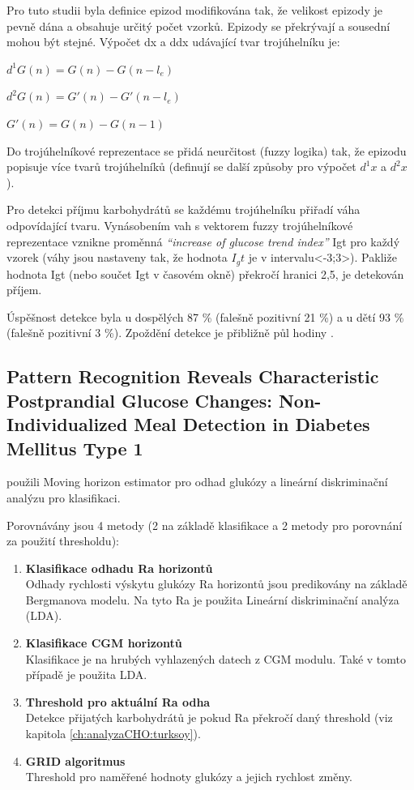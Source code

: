 Pro tuto studii byla definice epizod modifikována tak, že velikost epizody je pevně dána a obsahuje určitý počet vzorků. Epizody se překrývají a sousední mohou být stejné. Výpočet dx a ddx udávající tvar trojúhelníku je:

$d^{1}G(n)=G(n)-G(n-l_{e})$

$d^{2}G(n)=G'(n)-G'(n-l_{e})$

$G'(n)=G(n)-G(n-1)$

Do trojúhelníkové reprezentace se přidá neurčitost (fuzzy logika) tak, že epizodu popisuje více tvarů trojúhelníků (definují se další způsoby pro výpočet $d^1x$ a $d^2x$).

Pro detekci příjmu karbohydrátů se každému trojúhelníku přiřadí váha odpovídající tvaru. Vynásobením vah s vektorem fuzzy trojúhelníkové reprezentace vznikne proměnná \textit{“increase of glucose trend index”} Igt pro každý vzorek (váhy jsou nastaveny tak, že hodnota $I_gt$ je v intervalu<-3;3>). Pakliže hodnota Igt (nebo součet Igt v časovém okně) překročí hranici 2,5, je detekován příjem.

Úspěšnost detekce byla u dospělých 87 \% (falešně pozitivní 21 \%) a u dětí 93 \% (falešně pozitivní 3 \%). Zpoždění detekce je přibližně půl hodiny \citep{analyzaCHO.WaveletEst}.


\subsection{Pattern Recognition Reveals Characteristic Postprandial Glucose Changes: Non-Individualized Meal Detection in Diabetes Mellitus Type 1}
\label{ch:analyzaCHO:lda}

\citet{analyzaCHO.LDA} použili Moving horizon estimator pro odhad glukózy a lineární diskriminační analýzu pro klasifikaci.

Porovnávány jsou 4 metody (2 na základě klasifikace a 2 metody pro porovnání za použití thresholdu):

\begin{enumerate}
\item \textbf{Klasifikace odhadu Ra horizontů} \\
Odhady rychlosti výskytu glukózy Ra horizontů jsou predikovány na základě Bergmanova modelu. Na tyto Ra je použita Lineární diskriminační analýza (LDA).
\item \textbf{Klasifikace CGM horizontů} \\
Klasifikace je na hrubých vyhlazených datech z CGM modulu. Také v tomto případě je použita LDA.
\item \textbf{Threshold pro aktuální Ra odha} \\
Detekce přijatých karbohydrátů je pokud Ra překročí daný threshold (viz kapitola \ref{ch:analyzaCHO:turksoy}).
\item \textbf{GRID algoritmus} \\
Threshold pro naměřené hodnoty glukózy a jejich rychlost změny.
\end{enumerate}


